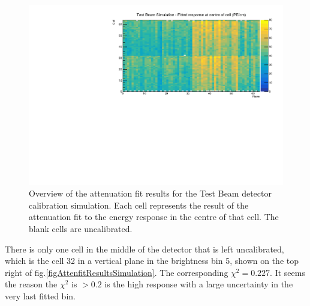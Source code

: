 \documentclass[12pt,a4paper]{article}
\begin{document}
\begin{figure}[h]
\centering
\includegraphics[width=\textwidth]{Plots/CellResponseAtCentre_Prod4DataBasedSim_Limited.pdf}
\caption{Overview of the attenuation fit results for the Test Beam detector calibration simulation. Each cell represents the result of the attenuation fit to the energy response in the centre of that cell. The blank cells are uncalibrated.}
\label{figCellCentreResponseSim}
\end{figure}

There is only one cell in the middle of the detector that is left uncalibrated, which is the cell 32 in a vertical plane in the brightness bin 5, shown on the top right of fig.\ref{figAttenfitResultsSimulation}. The corresponding $\chi^2=0.227$. It seems the reason the $\chi^2$ is $>0.2$ is the high response with a large uncertainty in the very last fitted bin.
\end{document}
